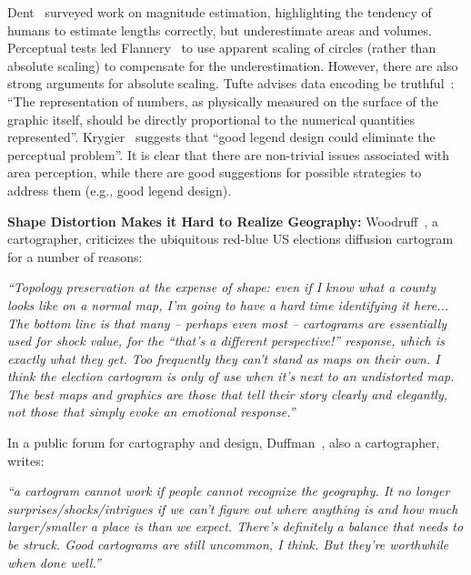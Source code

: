 \documentclass{egpubl}
\begin{document}
Dent~\cite{dent1975} surveyed work on magnitude estimation, highlighting the tendency of humans to estimate lengths correctly, but underestimate areas and volumes. Perceptual tests led Flannery~\cite{flannery} to use apparent scaling of circles (rather than absolute scaling) to compensate for the underestimation. However, there are also strong arguments for absolute scaling. Tufte advises data encoding be truthful~\cite{ref:Tufte:1983a}: ``The representation of numbers, as physically measured on the surface of the graphic itself, should be directly proportional to the numerical quantities represented''. Krygier~\cite{perceptual_scaling} suggests that ``good legend design could eliminate the perceptual problem''. 
It is clear that there are non-trivial issues associated with area perception, while there are good suggestions for possible strategies to address  them (e.g., good legend design).





\noindent
\textbf{Shape Distortion Makes it Hard to Realize Geography:}
Woodruff~\cite{Andyblog}, a cartographer, criticizes the ubiquitous red-blue US elections diffusion cartogram for a number of reasons: 

\hspace{0.01\textwidth}\parbox{0.45\textwidth}{\textit{``Topology preservation at the expense of shape: even if I know what a county looks like on a normal map, I'm going to have a hard time identifying it here... The bottom line is that many -- perhaps even most -- cartograms are essentially used for shock value, for the ``that's a different perspective!'' response, which is exactly what they get. Too frequently they can't stand as maps on their own. I think the election cartogram is only of use when it's next to an undistorted map. The best maps and graphics are those that tell their story clearly and elegantly, not those that simply evoke an emotional response.''  }}






In a public forum for cartography and design, Duffman~\cite{cartotalk}, also a cartographer, writes:

\hspace{0.01\textwidth}\parbox{0.45\textwidth}{\textit{
``a cartogram cannot work if people cannot recognize the geography. It no longer surprises/shocks/intrigues if we can't figure out where anything is and how much larger/smaller a place is than we expect. There's definitely a balance that needs to be struck. Good cartograms are still uncommon, I think. But they're worthwhile when done well.''
}} 
\end{document}
